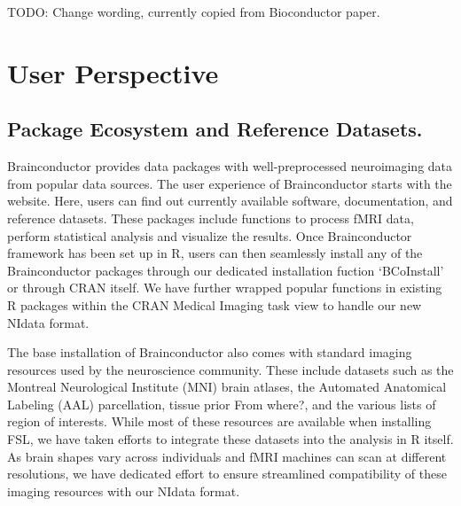 \documentclass{nature}
\begin{document}
{\color{red}TODO: Change wording, currently copied from Bioconductor paper.}



\section{User Perspective}


\subsection{Package Ecosystem and Reference Datasets.}
Brainconductor provides data packages with well-preprocessed neuroimaging data
from popular data sources.
The user experience of Brainconductor starts with the website. Here, users can
find out currently available software, documentation, and reference datasets.
These packages include functions to process fMRI data, perform statistical
analysis and visualize the results.
Once Brainconductor framework has been set up in R, users can then
seamlessly install any of the Brainconductor packages through our
dedicated installation fuction `BCoInstall' or through CRAN itself.
We have further wrapped popular functions in existing R packages
within the CRAN Medical Imaging task view to handle our new NIdata format.


The base installation of Brainconductor also comes with standard imaging
resources
used by the neuroscience community. These include datasets such
as the Montreal Neurological
Institute (MNI) brain atlases, the Automated Anatomical Labeling (AAL)
parcellation\cite{tzourio2002automated},
tissue prior {\color{red}From where?},
and the various lists of region of interests. While most of these
resources are available when installing FSL, we have taken
efforts to integrate these datasets into the analysis in R itself.
As brain shapes vary across individuals
and fMRI machines can scan at different resolutions, we have
dedicated effort
to ensure streamlined compatibility of these imaging resources with our NIdata
format.
\end{document}
